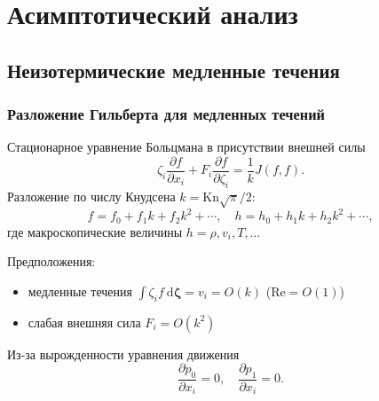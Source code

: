 \documentclass[mathserif]{beamer} %
\newcommand{\Kn}{\mathrm{Kn}}
\newcommand{\dd}{\:\mathrm{d}}
\newcommand{\pder}[2][]{\frac{\partial#1}{\partial#2}}
\newcommand{\dzeta}{\boldsymbol{\dd\zeta}}
\newcommand{\OO}[1]{O(#1)}
\begin{document}
\section{Асимптотический анализ}
\subsection{Неизотермические медленные течения}

\begin{frame}
    \frametitle{Разложение Гильберта для медленных течений}
    Стационарное уравнение Больцмана в присутствии внешней силы
    \begin{equation}\label{eq:Boltzmann}
        \zeta_i\pder[f]{x_i} + F_i\pder[f]{\zeta_i} = \frac1k J(f,f).
    \end{equation}
    Разложение по числу Кнудсена \(k=\Kn\sqrt\pi/2\):
    \begin{equation}\label{eq:expansion}
        f = f_0 + f_1k + f_2k^2 + \cdots, \quad h = h_0 + h_1k + h_2k^2 + \cdots,
    \end{equation}
    где макроскопические величины \(h = \rho, v_i, T, \dots\)
    \vspace{5pt}\pause

    Предположения:
    \begin{itemize}
        \item медленные течения \(\int\zeta_i f\dzeta = v_i = \OO{k}\) (\(\mathrm{Re} = \OO{1}\))
        \item слабая внешняя сила \(F_i = \OO{k^2}\)
    \end{itemize}
    Из-за вырожденности уравнения движения
    \begin{equation}
        \pder[p_0]{x_i} = 0, \quad \pder[p_1]{x_i} = 0.
    \end{equation}
\end{frame}
\end{document}
